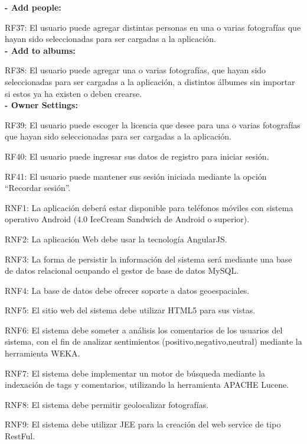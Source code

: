 \documentclass{memoria}
\begin{document}
\textbf{- Add people:}

RF37: El usuario puede agregar distintas personas en una o varias fotografías que hayan sido seleccionadas para ser cargadas a la aplicación.\\

\textbf{- Add to albums:}

RF38: El usuario puede agregar una o varias fotografías, que hayan sido seleccionadas para ser cargadas a la aplicación, a distintos álbumes sin importar si estos ya ha existen o deben crearse.\\

\textbf{- Owner Settings:}

RF39: El usuario puede escoger la licencia que desee para una o varias fotografías que hayan sido seleccionadas para ser cargadas a la aplicación.\\


RF40: El usuario puede ingresar sus datos de registro para iniciar sesión.

RF41: El usuario puede mantener sus sesión iniciada mediante la opción “Recordar sesión”.\\



RNF1: La aplicación deberá estar disponible para teléfonos móviles con sistema operativo Android (4.0 IceCream Sandwich de Android o superior).

RNF2: La aplicación Web debe usar la tecnología AngularJS.

RNF3: La forma de persistir la información del sistema será mediante una base de datos relacional ocupando el gestor de base de datos MySQL.

RNF4: La base de datos debe ofrecer soporte a datos geoespaciales.

RNF5: El sitio web del sistema debe utilizar HTML5 para sus vistas.

RNF6: El sistema debe someter a análisis los comentarios de los usuarios del sistema, con el fin de analizar sentimientos (positivo,negativo,neutral) mediante la herramienta WEKA.

RNF7: El sistema debe implementar un motor de búsqueda mediante la indexación de tags y comentarios, utilizando la  herramienta APACHE Lucene.

RNF8: El sistema debe permitir geolocalizar fotografías.

RNF9: El sistema debe utilizar JEE para la creación del web service de tipo RestFul.
\end{document}
